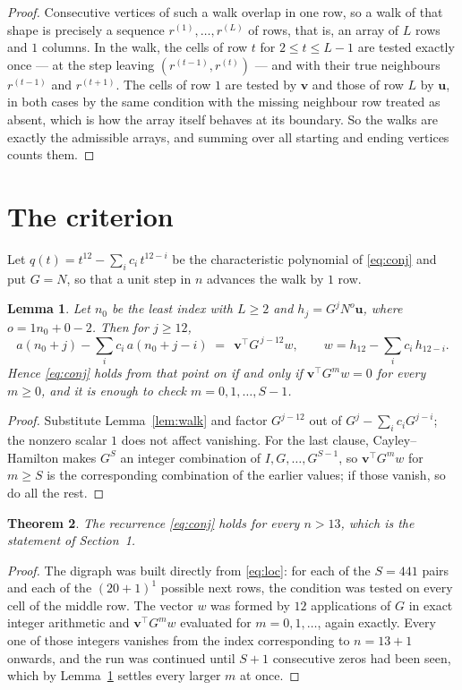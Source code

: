 \documentclass[11pt,a4paper]{article}
\theoremstyle{plain}
\newtheorem{theorem}{Theorem}
\newtheorem{lemma}[theorem]{Lemma}
\theoremstyle{definition}
\begin{document}
\begin{proof}
Consecutive vertices of such a walk overlap in one row, so a walk of that shape is
precisely a sequence $r^{(1)},\dots,r^{(L)}$ of rows, that is, an array of $L$ rows
and $1$ columns. In the walk, the cells of row $t$ for $2\le t\le L-1$ are tested
exactly once --- at the step leaving $(r^{(t-1)},r^{(t)})$ --- and with their true
neighbours $r^{(t-1)}$ and $r^{(t+1)}$. The cells of row $1$ are tested by
$\mathbf{v}$ and those of row $L$ by $\mathbf{u}$, in both cases by the same condition
with the missing neighbour row treated as absent, which is how the array itself behaves at
its boundary. So the walks are exactly the admissible arrays, and summing over all starting
and ending vertices counts them.
\end{proof}

\section{The criterion}

Let $q(t)=t^{12}-\sum_i c_i\,t^{12-i}$ be the characteristic polynomial of
\eqref{eq:conj} and put $G=N$, so that a unit step in $n$ advances the walk by
$1$ row.

\begin{lemma}\label{lem:crit}
Let $n_0$ be the least index with $L\ge2$ and $h_j=G^{j}N^{o}\mathbf{u}$, where
$o=1n_0+0-2$. Then for $j\ge12$,
\[
a(n_0+j)-\sum_i c_i\,a(n_0+j-i)\;=\;\,\mathbf{v}^{\!\top}G^{\,j-12}w,
\qquad w=h_{12}-\sum_i c_i\,h_{12-i} .
\]
Hence \eqref{eq:conj} holds from that point on if and only if
$\mathbf{v}^{\!\top}G^{m}w=0$ for every $m\ge0$, and it is enough to check
$m=0,1,\dots,S-1$.
\end{lemma}

\begin{proof}
Substitute Lemma~\ref{lem:walk} and factor $G^{j-12}$ out of
$G^{j}-\sum_ic_iG^{j-i}$; the nonzero scalar $1$ does not affect
vanishing. For the last clause, Cayley--Hamilton makes $G^{S}$ an integer combination of
$I,G,\dots,G^{S-1}$, so $\mathbf{v}^{\!\top}G^{m}w$ for $m\ge S$ is the corresponding
combination of the earlier values; if those vanish, so do all the rest.
\end{proof}

\begin{theorem}
The recurrence \eqref{eq:conj} holds for every $n>13$, which is the statement of
Section~1.
\end{theorem}

\begin{proof}
The digraph was built directly from \eqref{eq:loc}: for each of the $S=441$ pairs and each
of the $(20+1)^{1}$ possible next rows, the condition was tested on every cell of
the middle row. The vector $w$ was formed by $12$ applications of $G$ in exact integer
arithmetic and $\mathbf{v}^{\!\top}G^{m}w$ evaluated for $m=0,1,\dots$, again exactly.
Every one of those integers vanishes from the index corresponding to $n=13+1$ onwards,
and the run was continued until $S+1$ consecutive zeros had been seen, which by
Lemma~\ref{lem:crit} settles every larger $m$ at once.
\end{proof}
\end{document}
